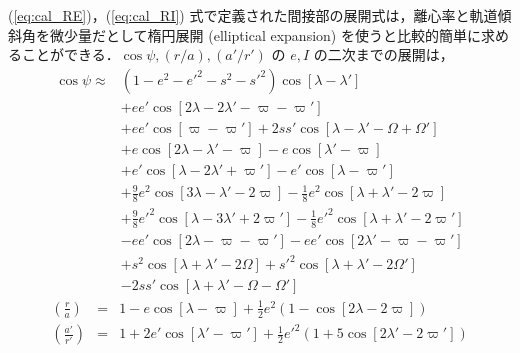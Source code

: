 \documentclass[11pt,a4paper,oneside,onecolumn]{jarticle}
\begin{document}
(\ref{eq:cal_RE})，(\ref{eq:cal_RI}) 式で定義された間接部の展開式は，離心率と軌道傾斜角を微少量だとして楕円展開 (elliptical expansion) を使うと比較的簡単に求めることができる．$\cos \psi, (r/a), (a'/r')$ の $e, I$ の二次までの展開は，
\begin{equation}
\begin{split}
\cos \psi \approx & (1 - e^2 - e'^2 - s^2 - s'^2) \cos [\lambda - \lambda'] \\
& + e e' \cos [2 \lambda - 2 \lambda' - \varpi - \varpi'] \\
& + e e' \cos [\varpi - \varpi'] + 2 s s' \cos [\lambda - \lambda' - \Omega + \Omega'] \\
& + e \cos [2 \lambda - \lambda' - \varpi] - e \cos [\lambda' - \varpi] \\
& + e' \cos [\lambda - 2 \lambda' + \varpi'] - e' \cos [\lambda - \varpi'] \\
& + \frac{9}{8} e^2 \cos [3 \lambda - \lambda' - 2 \varpi] - \frac{1}{8} e^2 \cos [\lambda + \lambda' - 2 \varpi] \\
& + \frac{9}{8} e'^2 \cos [\lambda - 3 \lambda' + 2 \varpi'] - \frac{1}{8} e'^2 \cos [\lambda + \lambda' - 2 \varpi'] \\
& - e e' \cos [2 \lambda - \varpi - \varpi'] - e e' \cos [2 \lambda' - \varpi - \varpi'] \\
& + s^2 \cos [\lambda + \lambda' - 2 \Omega] + s'^2 \cos [\lambda + \lambda' - 2 \Omega'] \\
& - 2 s s' \cos [\lambda + \lambda' - \Omega - \Omega']
\end{split}
\end{equation}
\begin{eqnarray}
\left( \frac{r}{a} \right) & = & 1 - e \cos [\lambda - \varpi] + \frac{1}{2} e^2 \left(1 - \cos [2 \lambda - 2 \varpi] \right) \\
\left( \frac{a'}{r'} \right) & = & 1 + 2 e' \cos [\lambda' - \varpi'] + \frac{1}{2} e'^2 \left(1 + 5 \cos [2 \lambda' - 2 \varpi'] \right)
\end{eqnarray}
\end{document}
